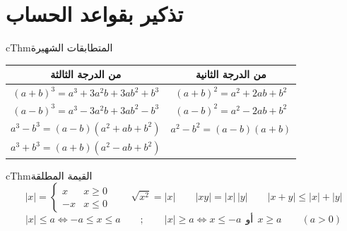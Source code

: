\documentclass[12pt,a4paper]{article}
\newenvironment{BOX}[2]{\begin{otherlanguage}{english}\begin{arbox}{#1}{#2}}{\end{arbox}\end{otherlanguage}}
\newenvironment{khassia}[1][خاصية]{\begin{BOX}{cThm}{#1}}{\end{BOX}}
\begin{document}
\section{تذكير بقواعد الحساب}
\begin{khassia}[المتطابقات الشهيرة]
\begin{center}
\renewcommand{\arraystretch}{1.5}
\begin{tabular}{|C|C|}\hline
\textbf{من الدرجة الثالثة} & \textbf{من الدرجة الثانية}\\\hline
$(a+b)^3=a^3+3a^2b+3ab^2+b^3$ & $(a+b)^2=a^2+2ab+b^2$\\
$(a-b)^3=a^3-3a^2b+3ab^2-b^3$ & $(a-b)^2=a^2-2ab+b^2$\\
$a^3-b^3=(a-b)\left(a^2+ab+b^2\right)$ & $a^2-b^2=(a-b)(a+b)$\\
 $a^3+b^3=(a+b)\left(a^2-ab+b^2\right)$ & \\\hline
\end{tabular}
\end{center}
\end{khassia}
\begin{khassia}[القيمة المطلقة]
\[|x|=\begin{cases}x & x\ge0\\-x & x\le0\end{cases}\qquad \sqrt{x^2}=|x|\qquad |xy|=|x|\,|y|\qquad |x+y|\le|x|+|y|\]
\[|x|\le a\iff-a\le x\le a\qquad;\qquad |x|\ge a\iff x\le-a\ \ \text{أو}\ \ x\ge a\qquad(a>0)\]
\end{khassia}

\end{document}
